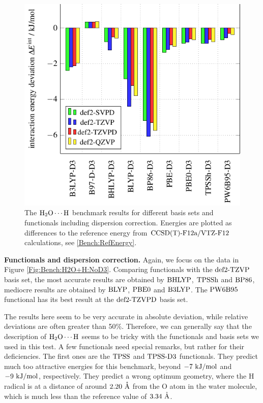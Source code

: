\begin{figure}[b!]
\includegraphics[width=.7\textwidth]{TikzPics/TikzCreation/Bench/BenchH2O+H.D3.pdf}
\caption{The $\mbox{\ensuremath{\text H _2 \text O \cdots \text H}}$ benchmark results for different basis sets and
functionals including dispersion correction.
Energies are plotted as differences to the reference energy from $\text{CCSD(T)-F12a}/\text{VTZ-F}12$ calculations,
see \eqref{Bench:RefEnergy}.}
\label{Fig:Bench:H2O+H:D3}
\end{figure}

\textbf{Functionals and dispersion correction.} Again, we focus on the data in
Figure \ref{Fig:Bench:H2O+H:NoD3}. Comparing functionals with the $\text{def2-TZVP}$ basis set,
the most accurate results are obtained by $\text{BHLYP}$, $\text{TPSSh}$ and $\text{BP86}$, mediocre
results are obtained by $\text{BLYP}$, $\text{PBE0}$ and $\text{B3LYP}$. The $\text{PW6B95}$ functional
has its best result at the $\text{def2-TZVPD}$ basis set.

The results here seem to be very accurate in
absolute deviation, while relative deviations are often greater than 50\%.
Therefore, we can generally say that the description of $\mbox{\ensuremath{\text H _2 \text O \cdots \text H}}$ seems to be
tricky with the functionals and basis sets we used in this test. 
A few functionals need special remarks, but rather for their deficiencies. The
first ones are the $\text{TPSS}$ and $\text{TPSS}\text{-D3}$ functionals. They predict much too
attractive energies for this benchmark, beyond $-7\ \text {kJ/mol}$ and $-9\ \kmo$,
respectively.
They predict
a wrong optimum geometry, where the H radical is at a distance of around $2.20~\mathring{\text{A}}$
from the O atom in the water molecule, which is much less than the reference
value of $3.34~\mathring{\text{A}}$. 

